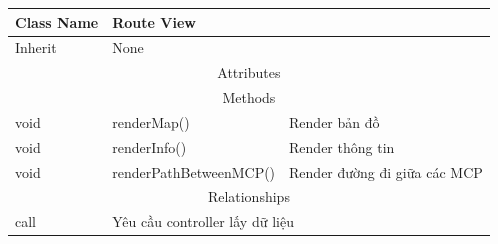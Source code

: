 \begin{enumerate}
        \begin{table}[htp]
            \begin{tabular}{|lll|}
                \hline
                \multicolumn{1}{|l|}{Class Name} & \multicolumn{2}{l|}{Route View}                                          \\ \hline
                \multicolumn{1}{|l|}{Inherit}    & \multicolumn{2}{l|}{None}                                               \\ \hline
                \multicolumn{3}{|c|}{\cellcolor[HTML]{FFFFC7}Attributes}                                                   \\ \hline
                \multicolumn{3}{|c|}{\cellcolor[HTML]{FFFFC7}Methods}                                                      \\ \hline
                \multicolumn{1}{|l|}{void}       & \multicolumn{1}{l|}{renderMap()} & Render bản đồ                        \\ \hline
                \multicolumn{1}{|l|}{void}       & \multicolumn{1}{l|}{renderInfo()}   & Render thông tin                  \\ \hline
                \multicolumn{1}{|l|}{void}       & \multicolumn{1}{l|}{renderPathBetweenMCP()}   & Render đường đi giữa các MCP  \\ \hline
                \multicolumn{3}{|c|}{\cellcolor[HTML]{FFFFC7}Relationships}                                                \\ \hline
                \multicolumn{1}{|l|}{call}   & \multicolumn{2}{l|}{Yêu cầu controller lấy dữ liệu}                         \\ \hline
            \end{tabular}
        \end{table}
    \end{enumerate}
